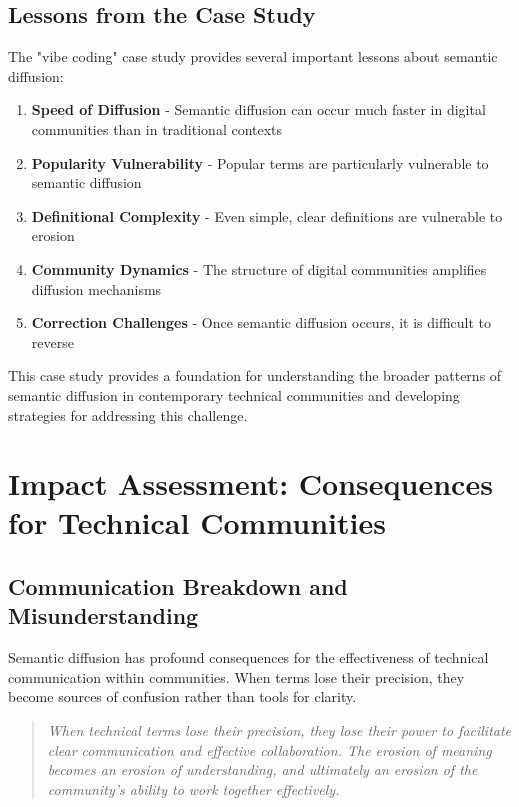 \documentclass[11pt]{article}
\begin{document}
\subsection{Lessons from the Case Study}

The "vibe coding" case study provides several important lessons about semantic diffusion:

\begin{enumerate}
\item \textbf{Speed of Diffusion} - Semantic diffusion can occur much faster in digital communities than in traditional contexts
\item \textbf{Popularity Vulnerability} - Popular terms are particularly vulnerable to semantic diffusion
\item \textbf{Definitional Complexity} - Even simple, clear definitions are vulnerable to erosion
\item \textbf{Community Dynamics} - The structure of digital communities amplifies diffusion mechanisms
\item \textbf{Correction Challenges} - Once semantic diffusion occurs, it is difficult to reverse
\end{enumerate}

This case study provides a foundation for understanding the broader patterns of semantic diffusion in contemporary technical communities and developing strategies for addressing this challenge.

\section{Impact Assessment: Consequences for Technical Communities}

\subsection{Communication Breakdown and Misunderstanding}

Semantic diffusion has profound consequences for the effectiveness of technical communication within communities. When terms lose their precision, they become sources of confusion rather than tools for clarity.

\begin{quote}
\emph{When technical terms lose their precision, they lose their power to facilitate clear communication and effective collaboration. The erosion of meaning becomes an erosion of understanding, and ultimately an erosion of the community's ability to work together effectively.}
\end{quote}
\end{document}

